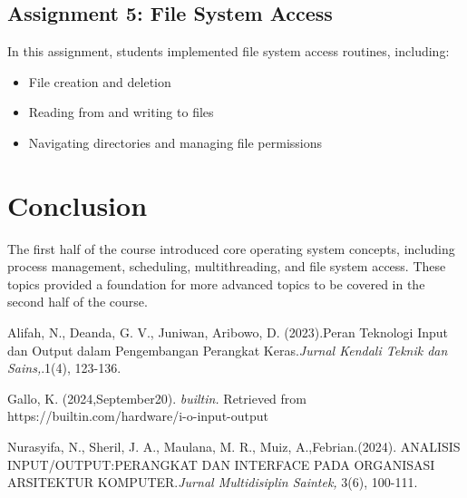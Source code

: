 \documentclass[12pt]{article}
\begin{document}
\subsection{Assignment 5: File System Access}
In this assignment, students implemented file system access routines, including:
\begin{itemize}
    \item File creation and deletion
    \item Reading from and writing to files
    \item Navigating directories and managing file permissions
\end{itemize}

\section{Conclusion}
The first half of the course introduced core operating system concepts, including process management, scheduling, multithreading, and file system access. These topics provided a foundation for more advanced topics to be covered in the second half of the course.

\pagebreak


\begin{thebibliography}{10}
    Alifah, N., Deanda, G. V., Juniwan, Aribowo, D. (2023).Peran Teknologi Input dan Output dalam Pengembangan Perangkat Keras.\textit{Jurnal Kendali Teknik dan Sains,}.1(4), 123-136.

    Gallo, K. (2024,September20). \textit{builtin.} Retrieved from https://builtin.com/hardware/i-o-input-output
    
    Nurasyifa, N., Sheril, J. A., Maulana, M. R., Muiz, A.,Febrian.(2024). ANALISIS INPUT/OUTPUT:PERANGKAT DAN INTERFACE PADA ORGANISASI ARSITEKTUR KOMPUTER.\textit{Jurnal Multidisiplin Saintek,} 3(6), 100-111.


\end{thebibliography}
\end{document}

